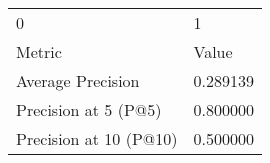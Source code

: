 \begin{tabular}{ll}
0 & 1 \\
Metric & Value \\
Average Precision & 0.289139 \\
Precision at 5 (P@5) & 0.800000 \\
Precision at 10 (P@10) & 0.500000 \\
\end{tabular}
